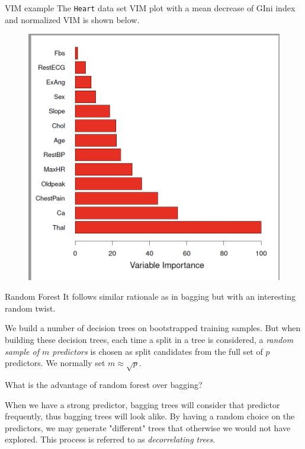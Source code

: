 \documentclass{beamer}
\begin{document}
\begin{frame}{VIM example}
	The {\tt Heart} data set VIM plot with a mean decrease of GIni index and normalized VIM is shown below.
	 \begin{figure}[h]
		\centering
		\includegraphics[scale=0.35]{../../Figures/fig_vim.png}
	\end{figure}
	
\end{frame}

\begin{frame}{Random Forest}
	It follows similar rationale as in bagging but with an interesting random twist.
	
	We build a number of decision trees on bootstrapped training samples. But when building these decision trees, each time a split in a tree is considered, a {\it random sample of $m$ predictors} is chosen as split candidates from the full set of $p$ predictors.  We normally set $m\approx \sqrt{p}$.
	
	What is the advantage of random forest over bagging?
	
	When we have a strong predictor, bagging trees will consider that predictor frequently, thus bagging trees will look alike. By having a random choice on the predictors, we may generate "different" trees that otherwise we would not have explored. This process is referred to as {\it decorrelating trees}. 

\end{frame}
\end{document}
